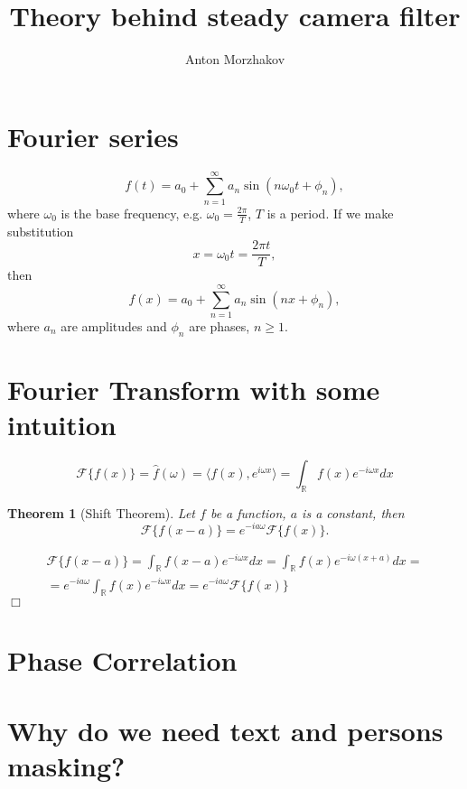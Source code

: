 \documentclass[11pt]{article}
\newtheorem{theorem}{Theorem}[section]
\newtheorem{proof}{Proof}
\renewenvironment{proof}{{\bf \emph{Proof.} }}{\hfill $\Box$ \\}
\begin{document}
\title{\sc Theory behind steady camera filter}
\author{Anton Morzhakov}
\maketitle

\section{Fourier series}\label{sec:theory-behind-fourier-series}
\[
    f(t) = a_0 + \sum_{n=1}^{\infty} a_n \sin (n \omega_0 t + \phi_n),
\]
where $\omega_0$ is the base frequency, e.g. $\omega_0 = \frac{2\pi}{T}$, $T$  is a period.
If we make substitution
\[
    x = \omega_0 t  = \frac{2\pi t}{T},
\]
then
\[
    f(x) = a_0 + \sum_{n=1}^{\infty} a_n \sin (n x + \phi_n),
\]
where $a_n$ are amplitudes and $\phi_n$ are phases, $n \geq 1$.

\section{Fourier Transform with some intuition}\label{sec:fourier-transform}

\[
    \mathcal F \{ f(x) \}  = \hat f (\omega) = \langle f(x), e^{i \omega x} \rangle =
    \int_{\mathbb R} f(x) e^{-i \omega x} dx
\]

\begin{theorem}[Shift Theorem] \label{shift_theorem}
    Let \(f\) be a function, $a$ is a constant, then
    \[
        \mathcal F \{ f(x - a) \} =  e^{-i a \omega} \mathcal F \{ f(x) \}.
    \]
\end{theorem}

\begin{proof}
    \begin{multline}
        \mathcal F \{ f(x - a) \}  =  \int_{\mathbb R} f(x - a) e^{-i \omega x} dx =
        \int_{\mathbb R} f(x) e^{-i \omega (x + a)} dx = \\
        = e^{-i a \omega} \int_{\mathbb R} f(x) e^{-i \omega x} dx = e^{-i a \omega} \mathcal F \{ f(x) \}
    \end{multline}
\end{proof}

\section{Phase Correlation}\label{sec:theory-behind-phase-correlation}

\section{Why do we need text and persons masking?}\label{sec:why-we-need-text-and-persond-masking?}
\end{document}
